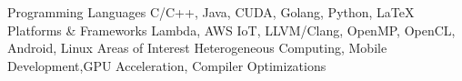 \begin{cventries}
\vspace{-10mm}
    \cvskill
    {Programming Languages}
    {C/C++, Java, CUDA, Golang, Python, LaTeX}
    \cvskill
    {Platforms \& Frameworks}
    {Lambda, AWS IoT, LLVM/Clang, OpenMP, OpenCL, Android, Linux}
    \cvskill
    {Areas of Interest}
    {Heterogeneous Computing, Mobile Development,\linebreak GPU Acceleration, Compiler Optimizations}
\end{cventries}
